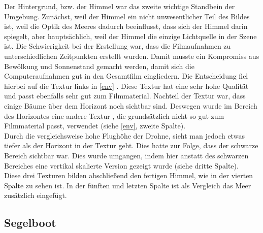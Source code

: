 Der Hintergrund, bzw. der Himmel war das zweite wichtige Standbein der Umgebung. Zunächst, weil der Himmel ein nicht unwesentlicher Teil des Bildes ist, weil die Optik des Meeres dadurch beeinflusst, dass sich der Himmel darin spiegelt, aber hauptsächlich, weil der Himmel die einzige Lichtquelle in der Szene ist. Die Schwierigkeit bei der Erstellung war, dass die Filmaufnahmen zu unterschiedlichen Zeitpunkten erstellt wurden. Damit musste ein Kompromiss aus Bewölkung und Sonnenstand gemacht werden, damit sich die Computeraufnahmen gut in den Gesamtfilm eingliedern. Die Entscheidung fiel hierbei auf die Textur links in \autoref{env} . Diese Textur hat eine sehr hohe Qualität und passt ebenfalls sehr gut zum Filmmaterial. Nachteil der Textur war, dass einige Bäume über dem Horizont noch sichtbar sind. Deswegen wurde im Bereich des Horizontes eine andere Textur , die grundsätzlich nicht so gut zum Filmmaterial passt, verwendet (siehe \autoref{env}, zweite Spalte).\\
Durch die vergleichsweise hohe Flughöhe der Drohne, sieht man jedoch etwas tiefer als der Horizont in der Textur geht. Dies hatte zur Folge, dass der schwarze Bereich sichtbar war. Dies wurde umgangen, indem hier anstatt des schwarzen Bereiches eine vertikal skalierte Version gezeigt wurde (siehe dritte Spalte).\\
Diese drei Texturen bilden abschließend den fertigen Himmel, wie in der vierten Spalte zu sehen ist. In der fünften und letzten Spalte ist als Vergleich das Meer zusätzlich eingefügt.

\subsection{Segelboot}


